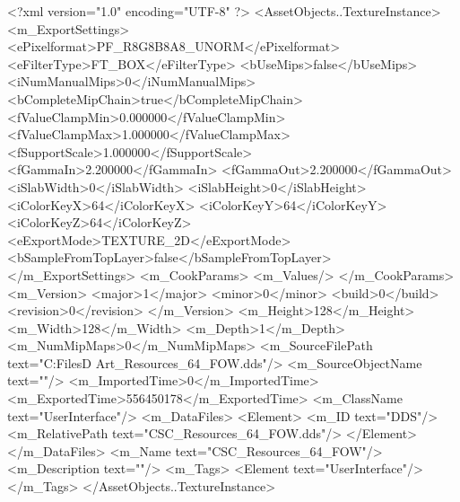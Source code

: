 <?xml version="1.0" encoding="UTF-8" ?>
<AssetObjects..TextureInstance>
	<m_ExportSettings>
		<ePixelformat>PF_R8G8B8A8_UNORM</ePixelformat>
		<eFilterType>FT_BOX</eFilterType>
		<bUseMips>false</bUseMips>
		<iNumManualMips>0</iNumManualMips>
		<bCompleteMipChain>true</bCompleteMipChain>
		<fValueClampMin>0.000000</fValueClampMin>
		<fValueClampMax>1.000000</fValueClampMax>
		<fSupportScale>1.000000</fSupportScale>
		<fGammaIn>2.200000</fGammaIn>
		<fGammaOut>2.200000</fGammaOut>
		<iSlabWidth>0</iSlabWidth>
		<iSlabHeight>0</iSlabHeight>
		<iColorKeyX>64</iColorKeyX>
		<iColorKeyY>64</iColorKeyY>
		<iColorKeyZ>64</iColorKeyZ>
		<eExportMode>TEXTURE_2D</eExportMode>
		<bSampleFromTopLayer>false</bSampleFromTopLayer>
	</m_ExportSettings>
	<m_CookParams>
		<m_Values/>
	</m_CookParams>
	<m_Version>
		<major>1</major>
		<minor>0</minor>
		<build>0</build>
		<revision>0</revision>
	</m_Version>
	<m_Height>128</m_Height>
	<m_Width>128</m_Width>
	<m_Depth>1</m_Depth>
	<m_NumMipMaps>0</m_NumMipMaps>
	<m_SourceFilePath text="C:\Users\Shadow\Desktop\Working Files\2D Art\Resources\CSC_Resources_64_FOW.dds"/>
	<m_SourceObjectName text=""/>
	<m_ImportedTime>0</m_ImportedTime>
	<m_ExportedTime>556450178</m_ExportedTime>
	<m_ClassName text="UserInterface"/>
	<m_DataFiles>
		<Element>
			<m_ID text="DDS"/>
			<m_RelativePath text="CSC_Resources_64_FOW.dds"/>
		</Element>
	</m_DataFiles>
	<m_Name text="CSC_Resources_64_FOW"/>
	<m_Description text=""/>
	<m_Tags>
		<Element text="UserInterface"/>
	</m_Tags>
</AssetObjects..TextureInstance>
